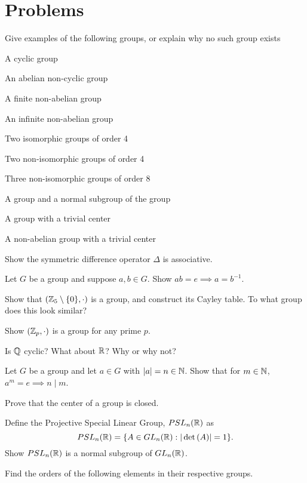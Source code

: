 \section*{Problems}
\begin{compactenum}
    \item Give examples of the following groups, or explain why no such group exists
    \begin{compactenum}
        \item A cyclic group
        \item An abelian non-cyclic group
        \item A finite non-abelian group
        \item An infinite non-abelian group
        \item Two isomorphic groups of order 4
        \item Two non-isomorphic groups of order 4
        \item Three non-isomorphic groups of order 8
        \item A group and a normal subgroup of the group
        \item A group with a trivial center
        \item A non-abelian group with a trivial center
    \end{compactenum}
    \item Show the symmetric difference operator $\Delta$ is associative.\label{prob:sym_dif_ass}
    \item Let $G$ be a group and suppose $a,b\in G$. Show $ab=e\implies a=b^{-1}$.
    \item Show that $(\mathbb{Z}_{5}\setminus\{0\},\cdot)$ is a group, and construct its Cayley table. To what group does this look similar?
    \item Show $(\mathbb{Z}_{p},\cdot)$ is a group for any prime $p$.
    \item Is $\mathbb{Q}$ cyclic? What about $\mathbb{R}$? Why or why not?
    \item Let $G$ be a group and let $a\in G$ with $|a|=n\in\mathbb{N}$. Show that for $m\in\mathbb{N}$, $a^{m}=e\implies n\mid m$.
    \item Prove that the center of a group is closed.
    \item Define the Projective Special Linear Group, $PSL_{n}(\mathbb{R})$ as
    \[
        PSL_{n}(\mathbb{R})=\{A\in GL_{n}(\mathbb{R}) : |\det{(A)}| = 1\}.
    \]
    Show $PSL_{n}(\mathbb{R})$ is a normal subgroup of $GL_{n}(\mathbb{R})$.
    \item Find the orders of the following elements in their respective groups.

\end{compactenum}
